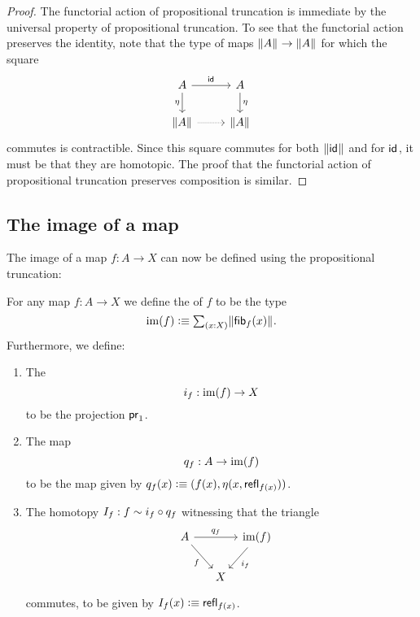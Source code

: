 \begin{proof}
  The functorial action of propositional truncation is immediate by the universal property of propositional truncation. To see that the functorial action preserves the identity, note that the type of maps $\Vert A\Vert_{}\to\Vert A\Vert_{}$ for which the square
  \begin{equation*}
    \begin{tikzcd}
      A \arrow[r,"\idfunc"] \arrow[d,swap,"\eta"] & A \arrow[d,"\eta"] \\
      \brck{A} \arrow[r,densely dotted] & \brck{A}
    \end{tikzcd}
  \end{equation*}
  commutes is contractible. Since this square commutes for both $\Vert \mathsf{id}_{}\Vert_{}$ and for $\mathsf{id}_{}$, it must be that they are homotopic. The proof that the functorial action of propositional truncation preserves composition is similar.
\end{proof}

\subsection{The image of a map}\label{sec:image-construction}
The image of a map $f:A\to X$ can now be defined using the propositional truncation:

\begin{defn}
For any map $f:A\to X$ we define the  of $f$ to be the type
\begin{equation*}
\im(f) \defeq \sm{x:X}\brck{\fib{f}{x}}.
\end{equation*}
Furthermore, we define:
\begin{enumerate}
\item The 
  \begin{equation*}
    i_f:\operatorname{im}(f)\to X
  \end{equation*}
  to be the projection $\mathsf{pr}_{1}$.
\item The map
  \begin{equation*}
    q_f:A\to\operatorname{im}(f)
  \end{equation*}
  to be the map given by $q_f(x)\vcentcolon\equiv(f(x),\eta(x,\mathsf{refl}_{f(x)}))$.
\item The homotopy $I_f:f\sim i_f\circ q_f$ witnessing that the triangle
  \begin{equation*}
    \begin{tikzcd}[column sep=tiny]
      A \arrow[rr,"q_f"] \arrow[dr,swap,"f"] & & \im(f) \arrow[dl,"i_f"] \\
      \phantom{\im(f)} & X
    \end{tikzcd}
  \end{equation*}
  commutes, to be given by $I_f(x)\vcentcolon\equiv\mathsf{refl}_{f(x)}$.
\end{enumerate}
\end{defn}

